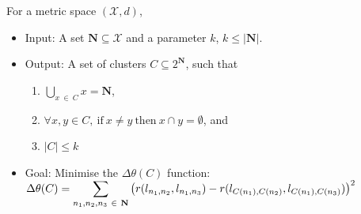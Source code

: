 For a metric space $(\mathcal{X}, d)$,
\begin{itemize}
    \item Input: A set $\textbf{N} \subseteq \mathcal{X}$ and a parameter $k$, $k \leq |\textbf{N}|$.
    \item Output: A set of clusters $C \subseteq 2^{\textbf{N}}$, such that
    \begin{enumerate}
        \item $\bigcup\limits_{x \ \in \ C}x = \textbf{N}$,
        \item $\forall x, y \in C, \ \text{if} \ x \neq y \ \text{then} \ x \cap y = \emptyset$, and
        \item $|C| \leq k$
    \end{enumerate} 
    \item Goal: Minimise the $\Delta\theta(C)$ function:\smallbreak $\Delta\theta(C) = \mathlarger{\sum}\limits_{n_1, n_2, n_3 \ \in \ \textbf{N}} \left( r(l_{n_1,n_2}, l_{n_1,n_3}) - r(l_{C(n_1),C(n_2)}, l_{C(n_1),C(n_3)}) \right)^2$ 



\end{itemize}

